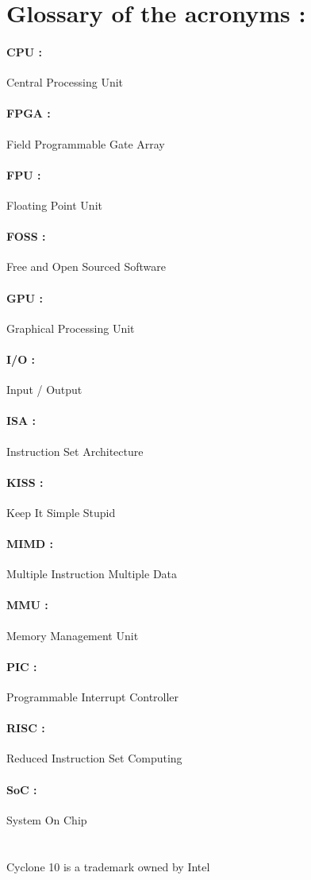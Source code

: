 \documentclass[12pt]{article}
\begin{document}
\section{Glossary of the acronyms :}

\paragraph{CPU : }Central Processing Unit
\paragraph{FPGA : }Field Programmable Gate Array
\paragraph{FPU : }Floating Point Unit
\paragraph{FOSS : }Free and Open Sourced Software
\paragraph{GPU : }Graphical Processing Unit
\paragraph{I/O : }Input / Output
\paragraph{ISA : }Instruction Set Architecture
\paragraph{KISS : }Keep It Simple Stupid
\paragraph{MIMD : }Multiple Instruction Multiple Data 
\paragraph{MMU : }Memory Management Unit
\paragraph{PIC : }Programmable Interrupt Controller
\paragraph{RISC : }Reduced Instruction Set Computing
\paragraph{SoC : }System On Chip

\section{}
Cyclone 10 is a trademark owned by Intel
\end{document}
